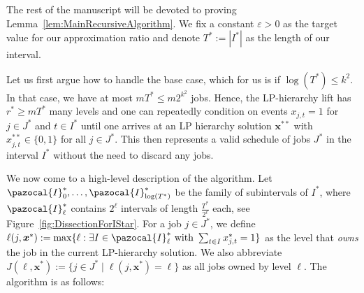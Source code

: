 \documentclass[11pt,letterpaper,oneside,english]{article}
\theoremstyle{theorem}
\begin{document}
The rest of the manuscript will be devoted to proving Lemma~\ref{lem:MainRecursiveAlgorithm}. 
We fix a constant $\varepsilon > 0$ as the target value for our approximation ratio
and denote $T^* := |I^*|$ as the length of our interval.

Let us first argue how to handle the base case, which for us is if $\log(T^*) \leq k^2$. 
In that case, we have at most $mT^* \leq m2^{k^2}$ jobs. Hence, the 
LP-hierarchy lift has  $r^* \geq mT^*$ many levels and one can repeatedly condition on events
$x_{j,t}=1$ for $j \in J^*$ and $t \in I^*$ until one arrives at an LP hierarchy solution $\bm{x}^{**}$
with $x_{j,t}^{**} \in \{ 0,1\}$ for all $j \in J^*$. This then represents a valid schedule of
jobs $J^*$ in the interval $I^*$ without the need to discard any jobs.


We now come to a high-level description of the algorithm. 
Let $\pazocal{I}_0^*,\ldots,\pazocal{I}_{\log(T^*)}^*$ be the family of
subintervals of $I^*$, where $\pazocal{I}_{\ell}^*$ contains $2^{\ell}$ intervals of length $\frac{T^*}{2^{\ell}}$
each, see Figure~\ref{fig:DissectionForIStar}. 
For a job $j \in J^*$, we define $\ell(j,\bm{x}^*) := \max\{ \ell : \exists I \in \pazocal{I}_{\ell}^*\textrm{ with } \sum_{t \in I}x_{j,t}^{*} = 1\}$ as the level that \emph{owns} the job in the current LP-hierarchy solution. 
We also abbreviate $J(\ell,\bm{x}^*) := \{ j \in J^{*} \mid \ell(j,\bm{x}^*) = \ell\}$ as 
all jobs owned by level $\ell$. The algorithm is as follows:
\end{document}
